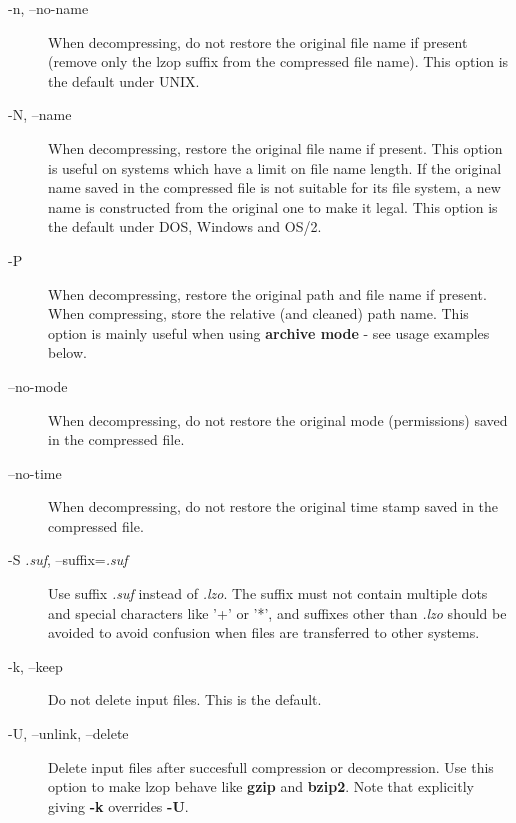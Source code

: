 \begin{description}
\item[-n, --no-name] \mbox{}

When decompressing, do not restore the original
file name if present (remove only the lzop suffix
from the compressed file name). This option is the
default under UNIX.


\item[-N, --name] \mbox{}

When decompressing, restore the original file name
if present. This option is useful on systems which
have a limit on file name length. If the original name saved in
the compressed file is not suitable for its file system, a
new name is constructed from the original one to make it
legal.
This option is the default under DOS, Windows and OS/2.


\item[-P] \mbox{}

When decompressing, restore the original path and file name if present.
When compressing, store the relative (and cleaned) path name.
This option is mainly useful when using \textbf{archive mode} - see
usage examples below.


\item[--no-mode] \mbox{}

When decompressing, do not restore the original
mode (permissions) saved in the compressed file.


\item[--no-time] \mbox{}

When decompressing, do not restore the original
time stamp saved in the compressed file.


\item[-S \textit{.suf}, --suffix=\textit{.suf}] \mbox{}

Use suffix \textit{.suf} instead of \textit{.lzo}. The suffix must
not contain multiple dots and special characters like '+' or '*',
and suffixes other than \textit{.lzo} should be avoided to avoid confusion
when files are transferred to other systems.


\item[-k, --keep] \mbox{}

Do not delete input files. This is the default.


\item[-U, --unlink, --delete] \mbox{}

Delete input files after succesfull compression or
decompression. Use this option to make lzop behave
like \textbf{gzip} and \textbf{bzip2}.
Note that explicitly giving \textbf{-k} overrides \textbf{-U}.



\end{description}
